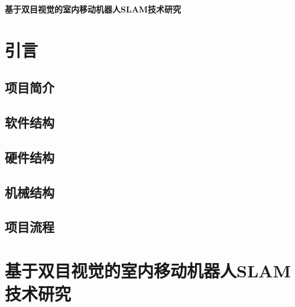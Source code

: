 \documentclass{article}
\begin{document}
\begin{center}
\textbf{基于双目视觉的室内移动机器人SLAM技术研究}{\heiti}
\end{center}
\section{引言}
\subsection{项目简介}
\subsection{软件结构}
\subsection{硬件结构}
\subsection{机械结构}
\subsection{项目流程}

\section{基于双目视觉的室内移动机器人SLAM技术研究}
\end{document}
